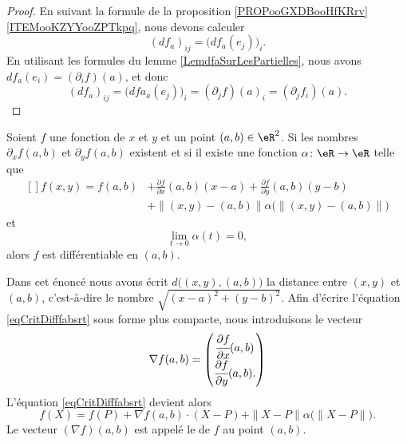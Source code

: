 \begin{proof}
	En suivant la formule de la proposition \ref{PROPooGXDBooHfKRrv}\ref{ITEMooKZYYooZPTkpq}, nous devons calculer
	\begin{equation}
		(df_a)_{ij}=\big( df_a(e_j) \big)_i.
	\end{equation}
	En utilisant les formules du lemme \ref{LemdfaSurLesPartielles}, nous avons \( df_a(e_i)=(\partial_if)(a)\), et donc
	\begin{equation}
		(df_a)_{ij}=\big( dfa_a(e_j) \big)_i=(\partial_jf)(a)_i=(\partial_jf_i)(a).
	\end{equation}
\end{proof}

\begin{proposition} \label{PropExistDiffUn}
	Soient \( f\) une fonction de \( x\) et \( y\) et un point \( (a,b)\in\eR^2\). Si les nombres \( \partial_xf(a,b)\) et \( \partial_yf(a,b)\) existent et si il existe une fonction \( \alpha\colon \eR\to \eR\) telle que
	\begin{equation}        \label{eqCritDifffabsrt}
		\begin{aligned}[]
			f(x,y)=f(a,b) & +\frac{ \partial f }{ \partial x }(a,b)(x-a)+\frac{ \partial f }{ \partial y }(a,b)(y-b) \\
			              & +\| (x,y)-(a,b) \| \alpha\Big( \| (x,y)-(a,b) \| \Big)
		\end{aligned}
	\end{equation}
	et
	\begin{equation}
		\lim_{t\to 0} \alpha(t)=0,
	\end{equation}
	alors \( f\) est différentiable en \( (a,b)\).
\end{proposition}


\begin{normaltext}
	Dans cet énoncé nous avons écrit \( d\big( (x,y),(a,b) \big)\) la distance entre \( (x,y)\) et \( (a,b)\), c'est-à-dire le nombre \( \sqrt{(x-a)^2+(y-b)^2}\). Afin d'écrire l'équation \eqref{eqCritDifffabsrt} sous forme plus compacte, nous introduisons le vecteur
	\begin{equation}
		\nabla f(a,b)=\begin{pmatrix}
			\cfrac{ \partial f }{ \partial x }(a,b) \\
			\cfrac{ \partial f }{ \partial y }(a,b).
		\end{pmatrix}
	\end{equation}
	L'équation \eqref{eqCritDifffabsrt} devient alors
	\begin{equation}        \label{EqdiffComp}
		f(X)=f(P)+\nabla f(a,b)\cdot (X-P)+\| X-P \|\alpha\big( \| X-P \| \big).
	\end{equation}
	Le vecteur \( (\nabla f)(a,b)\) est appelé le  de \( f\) au point \( (a,b)\).
\end{normaltext}

